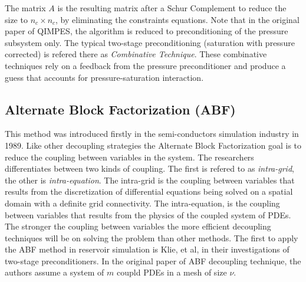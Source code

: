 The matrix $A$ is the resulting matrix after a Schur Complement to reduce the size to $n_{c}\times n_{c}$, by eliminating the constraints equations.
Note that in the original paper of QIMPES, the algorithm is reduced to preconditioning of the pressure subsystem only. The typical two-stage preconditioning
(saturation with pressure corrected) is refered there as \textit{Combinative Technique}. These combinative techniques rely on a feedback from the pressure preconditioner
and produce a guess that accounts for pressure-saturation interaction.

\subsection{Alternate Block Factorization (ABF)}
This method was introduced firstly in the semi-conductors simulation industry in 1989\supercite{Bank1989}. Like other decoupling strategies the
Alternate Block Factorization goal is to reduce the coupling between variables in the system. The researchers differentiates between two kinds
of coupling. The first is refered to as \textit{intra-grid}, the other is \textit{intra-equation}. The intra-grid is the coupling between 
variables that results from the discretization of differential equations being solved on a spatial domain with a definite grid connectivity.
The intra-equation, is the coupling between variables that results from the physics of the coupled system of PDEs.
The stronger the coupling between variables the more efficient decoupling techniques will be on solving the problem than other methods.
The first to apply the ABF method in reservoir simulation is Klie, et al\supercite{klie}, in their investigations of two-stage preconditioners. 
In the original paper of ABF decoupling technique, the authors assume a system of $m$ coupld PDEs in a mesh of size $\nu$.

